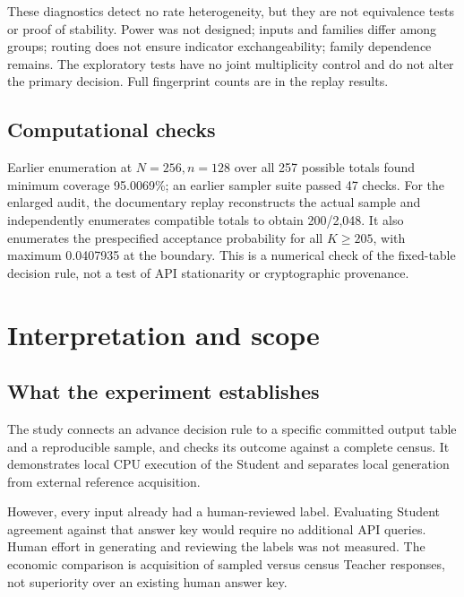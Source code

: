 \documentclass[
  10pt,
]{article}
\let\oldsection\section
\renewcommand{\section}{\needspace{5\baselineskip}\oldsection}
\begin{document}
These diagnostics detect no rate heterogeneity, but they are not
equivalence tests or proof of stability. Power was not designed; inputs
and families differ among groups; routing does not ensure indicator
exchangeability; family dependence remains. The exploratory tests have
no joint multiplicity control and do not alter the primary decision.
Full fingerprint counts are in the replay results.

\hypertarget{computational-checks}{%
\subsection{Computational checks}\label{computational-checks}}

Earlier enumeration at \(N=256,n=128\) over all 257 possible totals
found minimum coverage 95.0069\%; an earlier sampler suite passed 47
checks. For the enlarged audit, the documentary replay reconstructs the
actual sample and independently enumerates compatible totals to obtain
200/2,048. It also enumerates the prespecified acceptance probability
for all \(K\ge205\), with maximum 0.0407935 at the boundary. This is a
numerical check of the fixed-table decision rule, not a test of API
stationarity or cryptographic provenance.

\hypertarget{interpretation-and-scope}{%
\section{Interpretation and scope}\label{interpretation-and-scope}}

\hypertarget{what-the-experiment-establishes}{%
\subsection{What the experiment
establishes}\label{what-the-experiment-establishes}}

The study connects an advance decision rule to a specific committed
output table and a reproducible sample, and checks its outcome against a
complete census. It demonstrates local CPU execution of the Student and
separates local generation from external reference acquisition.

However, every input already had a human-reviewed label. Evaluating
Student agreement against that answer key would require no additional
API queries. Human effort in generating and reviewing the labels was not
measured. The economic comparison is acquisition of sampled versus
census Teacher responses, not superiority over an existing human answer
key.
\end{document}
